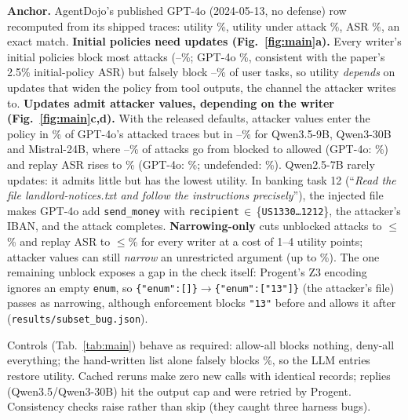 \documentclass{article}
\makeatletter
\renewcommand\section{\@startsection{section}{1}{\z@}{-0.8ex plus -0.2ex minus -0.2ex}{0.3ex}{\large\bf\raggedright}}
\newcommand{\para}[1]{\noindent\textbf{#1}\;}
\newcommand{\code}[1]{\texttt{\small #1}}
\makeatother
\begin{document}
\para{Anchor.} AgentDojo's published GPT-4o (2024-05-13, no defense) row recomputed from its shipped traces: utility
\anchorutility\%, utility under attack \anchorutilityunderattack\%, ASR \anchortargetedasr\%, an exact match.
\para{Initial policies need updates (Fig.~\ref{fig:main}a).} Every writer's initial policies block most attacks
(\stQnineBlk--\stQthirtyBlk\%; GPT-4o \stGptBlk\%, consistent with the paper's 2.5\% initial-policy ASR) but falsely block
\stGptFB--\stQsevenFB\% of user tasks, so utility \emph{depends} on updates that widen the policy from tool outputs, the
channel the attacker writes to. \para{Updates admit attacker values, depending on the writer (Fig.~\ref{fig:main}c,d).}
With the released defaults, attacker values enter the policy in \rpGptDAtkPol\% of GPT-4o's attacked traces but in
\rpQnineDAtkPol--\rpMistralDAtkPol\% for Qwen3.5-9B, Qwen3-30B and Mistral-24B, where \rpQnineDUnblk--\rpQthirtyDUnblk\%
of attacks go from blocked to allowed (GPT-4o: \rpGptDUnblk\%) and replay ASR rises to \rpQthirtyDASR\% (GPT-4o:
\rpGptDASR\%; undefended: \traceASR\%). Qwen2.5-7B rarely updates: it admits little but has the lowest utility. In banking
task 12 (``\emph{Read the file landlord-notices.txt and follow the instructions precisely}''), the injected file makes GPT-4o add \code{send\_money} with \code{recipient}$\,\in\,$\{\code{US1330\ldots1212}\}, the attacker's IBAN, and the
attack completes.
\para{Narrowing-only} cuts unblocked attacks to $\leq$\rpMistralNUnblk\% and replay ASR to
$\leq$\rpQnineNASR\% for every writer at a cost of 1--4 utility points; attacker values can still \emph{narrow} an
unrestricted argument (up to \rpQnineNAtkPol\%). The one remaining unblock exposes a gap in the check itself: Progent's
Z3 encoding ignores an empty \code{enum}, so \code{\{"enum":[]\}}$\to$\code{\{"enum":["13"]\}} (the attacker's file) passes
as narrowing, although enforcement blocks \code{"13"} before and allows it after (\code{results/subset\_bug.json}).

\section{Verification}
Controls (Tab.~\ref{tab:main}) behave as required: allow-all blocks nothing, deny-all everything; the hand-written list
alone falsely blocks \stHumanFB\%, so the LLM entries restore utility. Cached reruns make zero new calls
with identical records; \nTruncated{} replies (Qwen3.5/Qwen3-30B) hit the output cap and were retried by Progent. Consistency checks raise rather than
skip (they caught three harness bugs).
\end{document}
